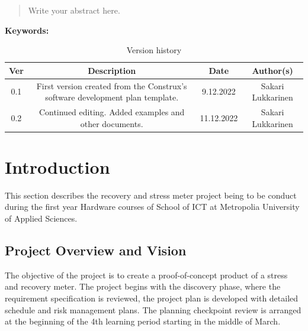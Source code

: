 \documentclass{article}
\begin{document}
\newpage

\begin{abstract}
Write your abstract here.
\end{abstract}




\begin{center}
\textbf{\large Keywords:}
\end{center}

\vspace{1cm}

\begin{table}[h]
\centering
\begin{tabular}{|c|c|c|c|}
\hline
\textbf{Ver} & \textbf{Description} & \textbf{Date} & \textbf{Author(s)} \\ \hline
0.1 & First version created from the Construx's software development plan template. & 9.12.2022 & Sakari Lukkarinen \\ \hline
0.2 & Continued editing. Added examples and other documents. & 11.12.2022 & Sakari Lukkarinen \\ \hline
\end{tabular}
\caption{Version history}
\label{table:version-history}
\end{table}

\begin{bf}
\begin{center}
\end{center}
\end{bf}

\newpage

\tableofcontents

\section{Introduction}
This section describes the recovery and stress meter project being to be
conduct during the first year Hardware courses of School of ICT at Metropolia
University of Applied Sciences.



\subsection{Project Overview and Vision}
The objective of the project is to create a proof-of-concept product of a stress and
recovery meter. The project begins with the discovery phase, where the
requirement specification is reviewed, the project plan is developed with detailed
schedule and risk management plans. The planning checkpoint review is
arranged at the beginning of the 4th learning period starting in the middle of
March.
\end{document}
